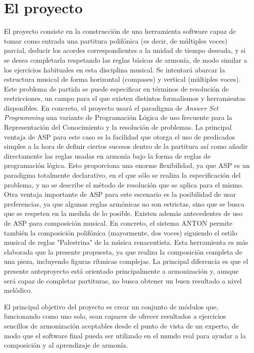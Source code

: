  \section{El proyecto}
  \label{sec:the_project}
 El proyecto consiste en la construcción de una herramienta software capaz de tomar como entrada una partitura polifónica (es decir, de múltiples voces) parcial, deducir los acordes correspondientes a la unidad de tiempo deseada, y si se desea completarla respetando las reglas básicas de armonía, de modo similar a los ejercicios habituales en esta disciplina musical. Se intentará abarcar la estructura musical de forma horizontal (compases) y vertical (múltiples voces). Este problema de partida se puede especificar en términos de resolución de restricciones, un campo para el que existen distintos formalismos y herramientas disponibles. En concreto, el proyecto usará el paradigma de \textit{Answer Set Programming} una variante de Programación Lógica de uso frecuente para la Representación del Conocimiento y la resolución de problemas. La principal ventaja de ASP para este caso es la facilidad que otorga el uso de predicados simples a la hora de definir ciertos sucesos dentro de la partitura así como añadir directamente las reglas usadas en armonía bajo la forma de reglas de programación lógica. Esto proporciona una enorme flexibilidad, ya que ASP es un paradigma totalmente declarativo, en el que sólo se realiza la especificación del problema, y no se describe el método de resolución que se aplica para el mismo. Otra ventaja importante de ASP para este escenario es la posibilidad de usar preferencias, ya que algunas reglas armónicas no son estrictas, sino que se busca que se respeten en la medida de lo posible. Existen además antecedentes de uso de ASP para composición musical. En concreto, el sistema ANTON permite también la composición polifónica (mayormente, dos voces) siguiendo el estilo musical de reglas "Palestrina" de la música renacentista. Esta herramienta es más elaborada que la presente propuesta, ya que realiza la composición completa de una pieza, incluyendo figuras rítmicas complejas. La principal diferencia es que el presente anteproyecto está orientado principalmente a armonización y, aunque será capaz de completar partituras, no busca obtener un buen resultado a nivel melódico.
 
 El principal objetivo del proyecto es crear un conjunto de módulos que, funcionando como uno solo, sean capaces de ofrecer resultados a ejercicios sencillos de armonización aceptables desde el punto de vista de un experto, de modo que el software final pueda ser utilizado en el mundo real para ayudar a la composición y al aprendizaje de armonía.
 
